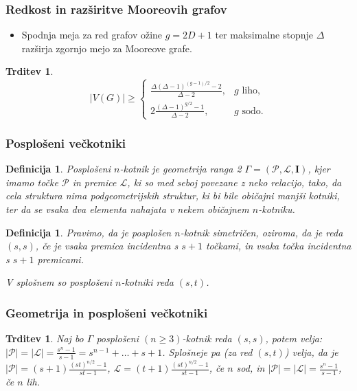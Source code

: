 \documentclass{beamer}
\newtheorem{trditev}[izrek]{Trditev}
\newtheorem{definicija}[izrek]{Definicija}
\newcommand{\II}{\mathbf{I}}
\newcommand{\PP}{\mathcal{P}}
\newcommand{\LL}{\mathcal{L}}
\begin{document}
\begin{frame}
    \frametitle{Redkost in razširitve Mooreovih grafov}
    \begin{itemize}
        \item[\textbullet] Spodnja meja za red grafov ožine $g=2D+1$
        ter maksimalne stopnje $\Delta$ razširja zgornjo mejo
        za Mooreove grafe. 

    \end{itemize}
            \begin{trditev}
            \begin{equation*}
        |V(G)| \ge
        \begin{cases}
        \frac{\Delta(\Delta-1)^{(g-1)/2}-2}{\Delta-2}, & g \text{ liho},\\[1em]
        2\frac{(\Delta-1)^{g/2}-1}{\Delta-2}, & g \text{ sodo}.
        \end{cases}
    \end{equation*}
        \end{trditev}
\end{frame}


\begin{frame}
\frametitle{Posplošeni večkotniki}
\begin{definicija}
    Posplošeni $n$-kotnik je geometrija ranga 2 \(\Gamma=(\PP, \LL, \II)\), kjer imamo
točke $\PP$ in premice $\LL$, ki so med seboj povezane z neko relacijo, 
tako, da cela struktura nima podgeometrijskih struktur, ki bi bile običajni manjši
kotniki, ter da se vsaka dva elementa nahajata v nekem običajnem $n$-kotniku.
\end{definicija}

\begin{definicija}
    Pravimo, da je posplošen $n$-kotnik simetričen, oziroma, da je reda $(s, s)$, če je vsaka
premica incidentna s $s + 1$ točkami, in vsaka točka incidentna s $s + 1$ premicami.

V splošnem so posplošeni $n$-kotniki reda $(s, t)$.
\end{definicija}
\end{frame}

\begin{frame}
    \frametitle{Geometrija in posplošeni večkotniki} 
    \begin{trditev}
        Naj bo $\Gamma$ posplošeni $(n \geq 3)$-kotnik reda $(s, s)$, potem velja:
         $|\PP| = |\LL| = \frac{s^n - 1}{s - 1} = s^{n-1} + \ldots + s + 1$.
        Splošneje pa (za red $(s, t)$) velja, da je 
        $|\PP| = (s+1)\frac{(st)^{n/2} - 1}{st - 1}$, $\LL = (t+1)\frac{(st)^{n/2} - 1}{st - 1}$, če $n$ sod,
        in $|\PP| = |\LL| = \frac{s^n - 1}{s - 1}$, če $n$ lih.
    \end{trditev}
\end{frame}
\end{document}
